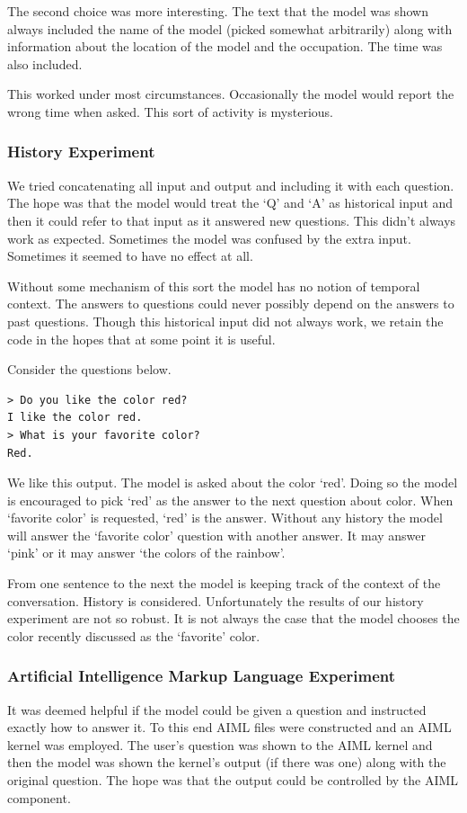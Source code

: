 The second choice was more interesting. The text that the model was shown always included the name of the model (picked somewhat arbitrarily) along with information about the location of the model and the occupation. The time was also included.

This worked under most circumstances. Occasionally the model would report the wrong time when asked. This sort of activity is mysterious.

\subsubsection{History Experiment}
We tried concatenating all input and output and including it with each question. The hope was that the model would treat the `Q' and `A' as historical input and then it could refer to that input as it answered new questions. This didn't always work as expected. Sometimes the model was confused by the extra input. Sometimes it seemed to have no effect at all.

Without some mechanism of this sort the model has no notion of temporal context. The answers to questions could never possibly depend on the answers to past questions. Though this historical input did not always work, we retain the code in the hopes that at some point it is useful.

Consider the questions below.
\begin{verbatim}
> Do you like the color red?
I like the color red.
> What is your favorite color?
Red.
\end{verbatim}
We like this output. The model is asked about the color `red'. Doing so the model is encouraged to pick `red' as the answer to the next question about color. When `favorite color' is requested, `red' is the answer. Without any history the model will answer the `favorite color' question with another answer. It may answer `pink' or it may answer `the colors of the rainbow'. 

From one sentence to the next the model is keeping track of the context of the conversation. History is considered. Unfortunately the results of our history experiment are not so robust. It is not always the case that the model chooses the color recently discussed as the `favorite' color.

\subsubsection{Artificial Intelligence Markup Language Experiment}
It was deemed helpful if the model could be given a question and instructed exactly how to answer it. To this end AIML files were constructed and an AIML kernel was employed. The user's question was shown to the AIML kernel and then the model was shown the kernel's output (if there was one) along with the original question. The hope was that the output could be controlled by the AIML component. 

